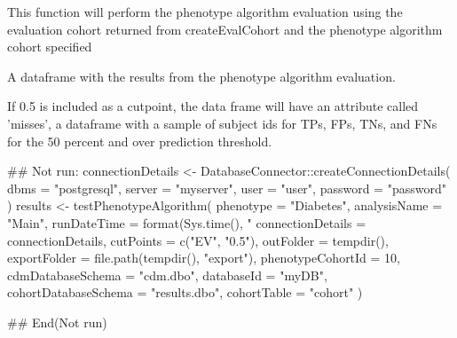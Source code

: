 \documentclass[a4paper]{book}
\begin{document}
%
\begin{Details}
This function will perform the phenotype algorithm evaluation using the evaluation cohort returned
from createEvalCohort and the phenotype algorithm cohort specified
\end{Details}
%
\begin{Value}
A dataframe with the results from the phenotype
algorithm evaluation.

If 0.5 is included as a cutpoint, the data frame will have an attribute called 'misses', a dataframe
with a sample of subject ids for TPs, FPs, TNs, and FNs for the 50 percent and over prediction threshold.
\end{Value}
%
\begin{Examples}
\begin{ExampleCode}
## Not run: 
connectionDetails <- DatabaseConnector::createConnectionDetails(
  dbms = "postgresql",
  server = "myserver",
  user = "user",
  password = "password"
)
results <- testPhenotypeAlgorithm(
  phenotype = "Diabetes",
  analysisName = "Main",
  runDateTime = format(Sys.time(), "%
  connectionDetails = connectionDetails,
  cutPoints = c("EV", "0.5"),
  outFolder = tempdir(),
  exportFolder = file.path(tempdir(), "export"),
  phenotypeCohortId = 10,
  cdmDatabaseSchema = "cdm.dbo",
  databaseId = "myDB",
  cohortDatabaseSchema = "results.dbo",
  cohortTable = "cohort"
)

## End(Not run)

\end{ExampleCode}
\end{Examples}
\printindex{}
\end{document}
